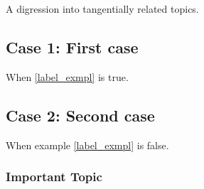 \documentclass{worksheet}
\begin{document}
	\begin{digression}
	    A digression into tangentially related topics.
	\end{digression}
    
    
    
    \subsection{Case 1: First case}
    When  \cref{label_exmpl} is true.
    \begin{warning}[A Warning:] %
     \lipsum[1][1-2]
    \end{warning}
    
    \subsection{Case 2: Second case}
    When example \ref{label_exmpl} is false.
        
        \subsubsection{Important Topic}
        \lipsum[2]
	
\end{document}
